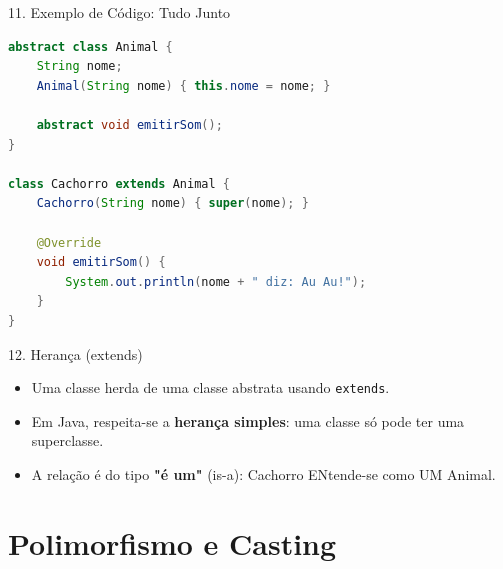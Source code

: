 \documentclass[9pt]{beamer}
\begin{document}
\begin{frame}[fragile]{11. Exemplo de Código: Tudo Junto}
\begin{lstlisting}[language=Java]
abstract class Animal {
    String nome;
    Animal(String nome) { this.nome = nome; }
    
    abstract void emitirSom();
}

class Cachorro extends Animal {
    Cachorro(String nome) { super(nome); }

    @Override
    void emitirSom() {
        System.out.println(nome + " diz: Au Au!");
    }
}
\end{lstlisting}
\end{frame}

\begin{frame}{12. Herança (extends)}
    \begin{itemize}
        \item Uma classe herda de uma classe abstrata usando \texttt{extends}.
        \item Em Java, respeita-se a \textbf{herança simples}: uma classe só pode ter uma superclasse.
        \item A relação é do tipo \textbf{"é um"} (is-a): Cachorro ENtende-se como UM Animal.
    \end{itemize}
\end{frame}

\section{Polimorfismo e Casting}
\end{document}
